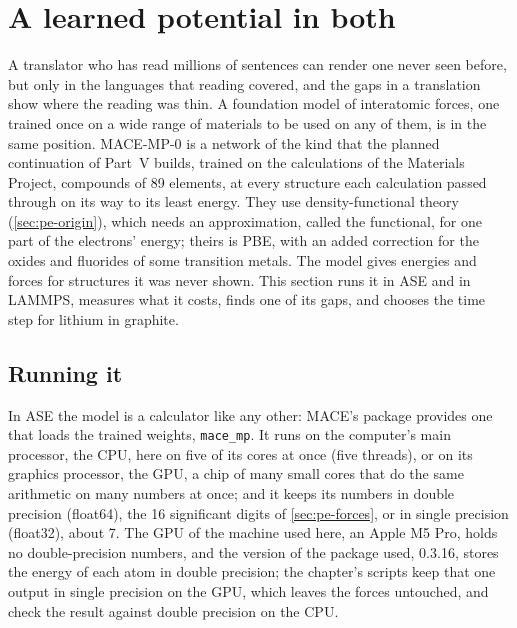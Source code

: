 \section{A learned potential in both}
\label{sec:ip-learned}

A translator who has read millions of sentences can render one never
seen before, but only in the languages that reading covered, and the
gaps in a translation show where the reading was thin. A foundation
model of interatomic forces, one trained once on a wide range of
materials to be used on any of them, is in the same position.
MACE-MP-0\cite{Batatia2025} is a network of the kind that the planned continuation of Part~V builds,
trained on the calculations of the Materials Project\cite{Deng2023},
compounds of 89 elements, at every structure each calculation passed
through on its way to its least energy. They use density-functional
theory (\cref{sec:pe-origin}), which needs an approximation, called the
functional, for one part of the electrons' energy; theirs is
PBE\cite{Perdew1996}, with an added correction for the oxides and
fluorides of some transition metals. The model gives energies and forces
for structures it was never shown. This section runs it in ASE
and in LAMMPS, measures what it costs, finds one of its gaps, and chooses
the time step for lithium in graphite.

\subsection*{Running it}

In ASE the model is a calculator like any other: MACE's package provides
one that loads the trained weights, \texttt{mace\_mp}. It runs on the
computer's main processor, the CPU, here on five of its cores at once
(five threads), or on its graphics processor, the GPU, a chip of many
small cores that do the same arithmetic on many numbers at once; and it
keeps its numbers in double precision (float64), the 16 significant
digits of \cref{sec:pe-forces}, or in single precision (float32), about
7. The GPU of the machine used here, an Apple M5 Pro, holds no
double-precision numbers, and the
version of the package used, 0.3.16, stores the energy of each atom in
double precision; the chapter's scripts keep that one output in single
precision on the GPU, which leaves the forces untouched, and check the
result against double precision on the CPU.

